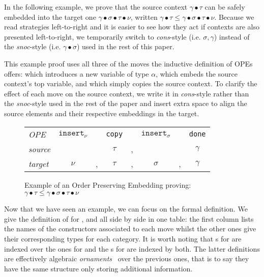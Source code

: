 In the following example, we prove that the source context $\gamma ∙ \tau$
can be safely embedded into the target one $\gamma ∙ \sigma ∙ \tau ∙ \nu$,
written $\gamma ∙ \tau \leq \gamma ∙ \sigma ∙ \tau ∙ \nu$. Because we read
strategies left-to-right and it is easier to see how they act if contexts
are also presented left-to-right, we temporarily switch to \emph{cons}-style
(i.e. $\sigma , \gamma$) instead of the \emph{snoc}-style (i.e. $\gamma ∙ \sigma$)
used in the rest of this paper.

This example proof uses all three of the moves the inductive definition of
OPEs offers: \opeinsert{\alpha} which introduces a new variable of type
$\alpha$, \opecopy{} which embeds the source context's top variable,
and \opedone{} which simply copies the source context. To clarify the
effect of each move on the source context, we write it in \textit{cons}-style
rather than the \textit{snoc}-style used in the rest of the paper and insert
extra space to align the source elements and their respective embeddings in
the target.

\begin{figure}[ht]\centering
\begin{tabular}{l|ccccccc}
\textit{OPE} & $\texttt{insert}_{\nu}$ &
             & \texttt{copy} &
             & $\texttt{insert}_{\sigma}$ &
             & \texttt{done}\\
\textit{source} & &
                & $\tau$ & ,
                & &
                & $\gamma$ \\
\textit{target} & $\nu$ & ,
                & $\tau$ & ,
                & $\sigma$ & ,
                & $\gamma$ \\
\end{tabular}
\caption{Example of an Order Preserving Embedding proving:
         $\gamma ∙ \tau
          \leq
          \gamma ∙ \sigma ∙ \tau ∙ \nu$\label{figure:exampleOpe}}
\end{figure}

Now that we have seen an example, we can focus on the formal definition.
We give the definition of \OPE{} for \Nat{}, \Context{} and \Usages{} all
side by side in one table: the first column lists the names of the
constructors associated to each move whilst the other ones give their
corresponding types for each category. It is worth noting that \OPE{}s for
\Context{} are indexed over the ones for \Nat{} and the \OPE{}s for \Usages{}
are indexed by both. The latter definitions are effectively algebraic
\emph{ornaments}~\cite{dagand2014transporting, mcbride2010ornamental} over
the previous ones, that is to say they have the same structure only storing
additional information.

